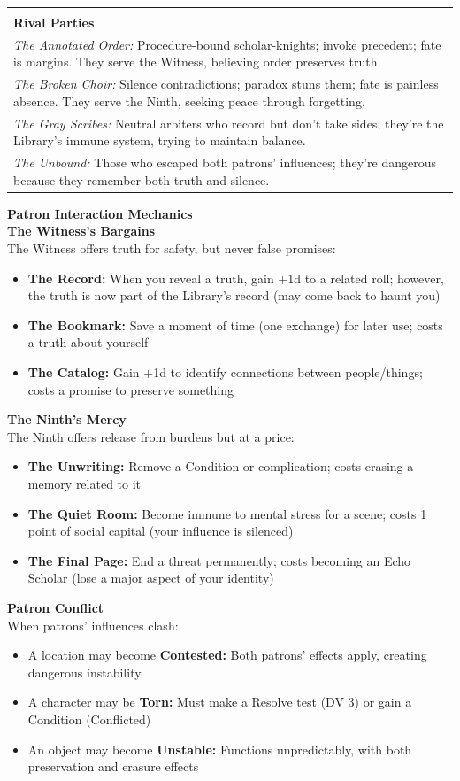 \documentclass[10pt,letterpaper]{article}
\makeatletter
\newcommand{\sectionheader}[1]{\vspace{0.5em}\textbf{\large #1}\\[0.3em]}
\newcommand{\subsectionheader}[1]{\textbf{#1}\\}
\newenvironment{npcbox}{%
  \par\noindent\begin{longtable}{@{}p{6.5in}@{}}\hline\\[-0.8em]
}{%
  \vspace{0.2em}\\\hline\end{longtable}\par
}
\makeatother
\begin{document}
\begin{npcbox}
\textbf{Rival Parties}\\
\emph{The Annotated Order:} Procedure-bound scholar-knights; invoke precedent; fate is margins. They serve the Witness, believing order preserves truth.\\
\emph{The Broken Choir:} Silence contradictions; paradox stuns them; fate is painless absence. They serve the Ninth, seeking peace through forgetting.\\
\emph{The Gray Scribes:} Neutral arbiters who record but don't take sides; they're the Library's immune system, trying to maintain balance.\\
\emph{The Unbound:} Those who escaped both patrons' influences; they're dangerous because they remember both truth and silence.
\end{npcbox}

\sectionheader{Patron Interaction Mechanics}

\subsectionheader{The Witness's Bargains}
The Witness offers truth for safety, but never false promises:
\begin{itemize}
    \item \textbf{The Record:} When you reveal a truth, gain +1d to a related roll; however, the truth is now part of the Library's record (may come back to haunt you)
    \item \textbf{The Bookmark:} Save a moment of time (one exchange) for later use; costs a truth about yourself
    \item \textbf{The Catalog:} Gain +1d to identify connections between people/things; costs a promise to preserve something
\end{itemize}

\subsectionheader{The Ninth's Mercy}
The Ninth offers release from burdens but at a price:
\begin{itemize}
    \item \textbf{The Unwriting:} Remove a Condition or complication; costs erasing a memory related to it
    \item \textbf{The Quiet Room:} Become immune to mental stress for a scene; costs 1 point of social capital (your influence is silenced)
    \item \textbf{The Final Page:} End a threat permanently; costs becoming an Echo Scholar (lose a major aspect of your identity)
\end{itemize}

\subsectionheader{Patron Conflict}
When patrons' influences clash:
\begin{itemize}
    \item A location may become \textbf{Contested:} Both patrons' effects apply, creating dangerous instability
    \item A character may be \textbf{Torn:} Must make a Resolve test (DV 3) or gain a Condition (Conflicted)
    \item An object may become \textbf{Unstable:} Functions unpredictably, with both preservation and erasure effects
\end{itemize}
\end{document}
